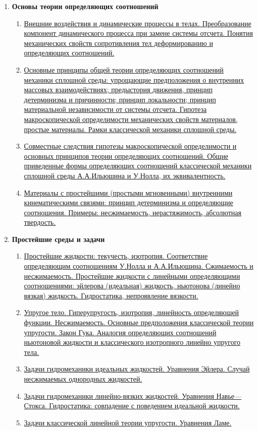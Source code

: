 \documentclass[a4paper,12pt]{article}
\begin{document}
\begin{enumerate}
\begin{enumerate}
\end{enumerate}

\item \textbf{ Основы теории определяющих соотношений}
\begin{enumerate}

\item \hyperlink{bil5_1}{Внешние воздействия и динамические процессы в телах. Преобразование компонент динамического процесса при замене системы отсчета. Понятия механических свойств сопротивления тел деформированию и определяющих соотношений. }
\item \hyperlink{bil5_2}{Основные принципы общей теории определяющих соотношений механики сплошной среды: упрощающие предположения о внутренних массовых взаимодействиях; предыстория движения, принцип детерминизма и причинности; принцип локальности; принцип материальной независимости от системы отсчета. Гипотеза макроскопической определимости механических свойств материалов, простые материалы. Рамки классической механики сплошной среды.}
\item \hyperlink{bil5_3}{Совместные следствия гипотезы макроскопической определимости и основных принципов теории определяющих соотношений. Общие приведенные формы определяющих соотношений классической механики сплошной среды А.А.Ильюшина и У.Нолла, их эквивалентность.}
\item \hyperlink{bil5_4}{Материалы с простейшими (простыми мгновенными) внутренними кинематическими связями: принцип детерминизма и определяющие соотношения. Примеры: несжимаемость, нерастяжимость, абсолютная твердость.}
\end{enumerate}


\item \textbf{  Простейшие среды и задачи}
\begin{enumerate}
\item \hyperlink{bil6_1}{Простейшие жидкости: текучесть, изотропия. Соответствие определяющим соотношениям У.Нолла и А.А.Ильюшина. Сжимаемость и несжимаемость. Простейшие жидкости с линейными определяющими соотношениями: эйлерова (идеальная) жидкость, ньютонова (линейно вязкая) жидкость. Гидростатика, непроявление вязкости.}
\item \hyperlink{bil6_2}{Упругое тело. Гиперупругость, изотропия, линейность определяющей функции. Несжимаемость. Основные предположения классической теории упругости. Закон Гука. Аналогия определяющих соотношений ньютоновой жидкости и классического изотропного линейно упругого тела.}
\item \hyperlink{bil6_3}{Задачи гидромеханики идеальных жидкостей. Уравнения Эйлера. Случай несжимаемых однородных жидкостей. }
\item \hyperlink{bil6_4}{Задачи гидромеханики линейно-вязких жидкостей. Уравнения Навье—Стокса. Гидростатика: совпадение с поведением идеальной жидкости. }
\item \hyperlink{bil6_5}{Задачи классической линейной теории упругости. Уравнения Ламе. }

\end{enumerate}
\end{enumerate}
\end{document}
